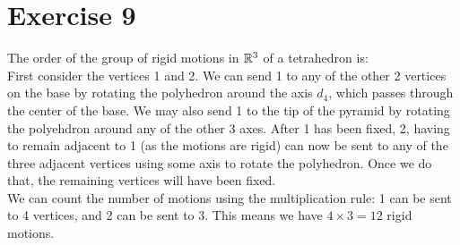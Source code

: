 \documentclass[12pt]{article}
\begin{document}
    
    \section*{Exercise 9}
    The order of the group of rigid motions in $\mathbb{R}^3$ of a tetrahedron is: \\
    First consider the vertices 1 and 2.
    We can send 1 to any of the other 2 vertices on the base by rotating the
    polyhedron around the axis $d_4$, which passes through the center of
    the base. We may also send 1 to the tip of the pyramid by rotating the
    polyehdron around any of the other 3 axes.
    After 1 has been fixed, 2, having to remain adjacent to 1 (as the
    motions are rigid) can now be sent to any of the three adjacent vertices
    using some axis to rotate the polyhedron. Once we do that, the
    remaining vertices will have been fixed. \\
    We can count the number of motions using the multiplication rule:
    1 can be sent to 4 vertices, and 2 can be sent to 3. This means we
    have $4 \times 3 = 12$ rigid motions. 
\end{document}
